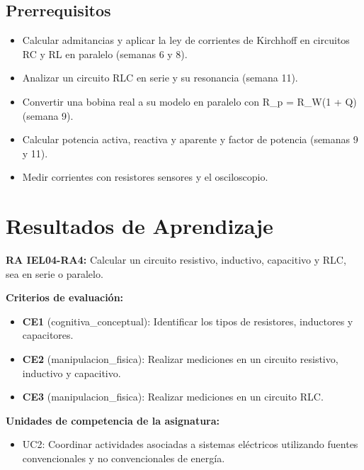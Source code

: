 \documentclass[11pt,letterpaper]{article}
\begin{document}
\subsection{Prerrequisitos}

\begin{itemize}
  \item Calcular admitancias y aplicar la ley de corrientes de Kirchhoff en circuitos RC y RL en paralelo (semanas 6 y 8).
  \item Analizar un circuito RLC en serie y su resonancia (semana 11).
  \item Convertir una bobina real a su modelo en paralelo con R\_p = R\_W(1 + Q\texttwosuperior{}) (semana 9).
  \item Calcular potencia activa, reactiva y aparente y factor de potencia (semanas 9 y 11).
  \item Medir corrientes con resistores sensores y el osciloscopio.
\end{itemize}

\section{Resultados de Aprendizaje}

\begin{alineacion}
\textbf{RA IEL04-RA4:} Calcular un circuito resistivo, inductivo, capacitivo y RLC, sea en serie o paralelo.

\textbf{Criterios de evaluación:}

\begin{itemize}
  \item \textbf{CE1} (cognitiva\_conceptual): Identificar los tipos de resistores, inductores y capacitores.
  \item \textbf{CE2} (manipulacion\_fisica): Realizar mediciones en un circuito resistivo, inductivo y capacitivo.
  \item \textbf{CE3} (manipulacion\_fisica): Realizar mediciones en un circuito RLC.
\end{itemize}

\textbf{Unidades de competencia de la asignatura:}

\begin{itemize}
  \item UC2: Coordinar actividades asociadas a sistemas eléctricos utilizando fuentes convencionales y no convencionales de energía.
\end{itemize}
\end{alineacion}
\end{document}
